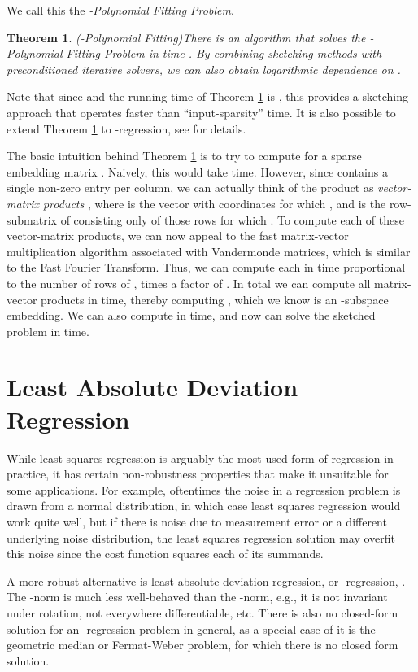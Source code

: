 \documentclass[11pt]{article}
\newtheorem{theorem}{Theorem}
\begin{document}
We call this the {\it -Polynomial Fitting Problem}.

\begin{theorem}(-Polynomial Fitting)\cite{asw13}\label{thm:FastVand}
There is an algorithm that solves the -Polynomial Fitting Problem
in time . By
combining sketching methods with preconditioned iterative solvers, we can
also obtain logarithmic dependence on .  
\end{theorem}
Note that since  and the running time of Theorem \ref{thm:FastVand}
is , this provides a sketching approach that operates faster than ``input-sparsity'' time. It
is also possible to extend Theorem \ref{thm:FastVand} to -regression, see \cite{asw13} for details. 

The basic intuition behind Theorem \ref{thm:FastVand} is to try to compute  for
a sparse embedding matrix . Naively, this would take  time. However, since  contains
a single non-zero entry per column, we can actually think of the product  as
 {\it vector-matrix products} , where  is the vector
with coordinates  for which , and  is the row-submatrix of 
consisting only of those rows  for which .  To compute each of these vector-matrix products,
we can now appeal to the fast matrix-vector multiplication algorithm associated with Vandermonde matrices, which
is similar to the Fast Fourier Transform. Thus, we can compute each  in time proportional
to the number of rows of , times a factor of . In total we can compute all matrix-vector
products in  time, thereby computing , which we know is an -subspace
embedding. We can also compute  in  time, and now can solve the sketched problem
 in  time. 

\section{Least Absolute Deviation Regression}\label{chap:robust}
While least squares regression is arguably the most used form of regression in practice, it
has certain non-robustness properties that make it unsuitable for some applications. For
example, oftentimes the noise in a regression problem is drawn from a normal distribution, in 
which case least squares regression would work quite well, but if there is noise due to 
measurement error or a different underlying noise distribution, the least squares 
regression solution may overfit this noise since the cost function squares each of its 
summands. 

A more robust alternative is least absolute deviation regression, or -regression, 
. The -norm
is much less well-behaved than the -norm, e.g., it is not invariant under rotation,
not everywhere differentiable, etc. There is also no closed-form solution for an
-regression problem in general, as a special case of it is the geometric median
or Fermat-Weber problem, for which there is no closed form solution. 
\end{document}
